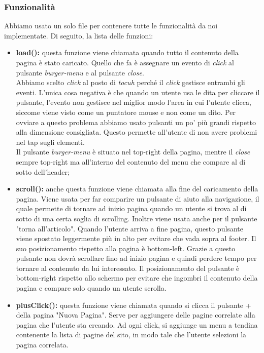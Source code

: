 \subsubsection{Funzionalità}
Abbiamo usato un solo file per contenere tutte le funzionalità da noi implementate. Di seguito, la lista delle funzioni:
\begin{itemize}
	\item \textbf{load():} questa funzione viene chiamata quando tutto il contenuto della pagina è stato caricato. Quello che fa è assegnare un evento di \textit{click} al pulsante \textit{burger-menu} e al pulsante \textit{close}.\\
	Abbiamo scelto \textit{click} al posto di \textit{tocuh} perché il \textit{click} gestisce entrambi gli eventi. L'unica cosa negativa è che quando un utente usa le dita per cliccare il pulsante, l'evento non gestisce nel miglior modo l'area in cui l'utente clicca, siccome viene visto come un puntatore mouse e non come un dito. Per ovviare a questo problema abbiamo usato pulsanti un po' più grandi rispetto alla dimensione consigliata. Questo permette all'utente di non avere problemi nel tap sugli elementi.\\
	Il pulsante \textit{burger-menu} è situato nel top-right della pagina, mentre il \textit{close} sempre top-right ma all'interno del contenuto del menu che compare al di sotto dell'header;
	\item \textbf{scroll():} anche questa funzione viene chiamata alla fine del caricamento della pagina. Viene usata per far comparire un pulsante di aiuto alla navigazione, il quale permette di tornare ad inizio pagina quando un utente si trova al di sotto di una certa soglia di scrolling. Inoltre viene usata anche per il pulsante "torna all'articolo". Quando l'utente arriva a fine pagina, questo pulsante viene spostato leggermente più in alto per evitare che vada sopra al footer. Il suo posizionamento rispetto alla pagina è bottom-left. Grazie a questo pulsante non dovrà scrollare fino ad inizio pagina e quindi perdere tempo per tornare al contenuto da lui interessato. Il posizionamento del pulsante è bottom-right rispetto allo schermo per evitare che ingombri il contenuto della pagina e compare solo quando un utente scrolla.
	\item \textbf{plusClick():} questa funzione viene chiamata quando si clicca il pulsante + della pagina "Nuova Pagina". Serve per aggiungere delle pagine correlate alla pagina che l'utente sta creando. Ad ogni click, si aggiunge un menu a tendina contenente la lista di pagine del sito, in modo tale che l'utente selezioni la pagina correlata.

\end{itemize}
